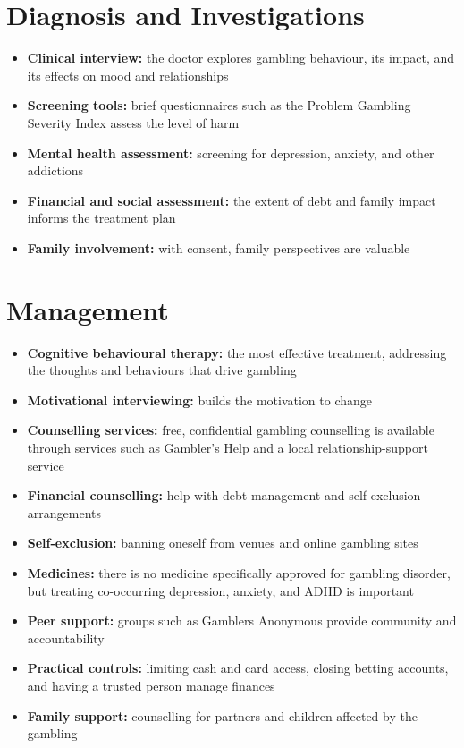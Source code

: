 \section*{Diagnosis and Investigations}
\begin{itemize}
    \item \textbf{Clinical interview:} the doctor explores gambling behaviour, its impact, and its effects on mood and relationships
    \item \textbf{Screening tools:} brief questionnaires such as the Problem Gambling Severity Index assess the level of harm
    \item \textbf{Mental health assessment:} screening for depression, anxiety, and other addictions
    \item \textbf{Financial and social assessment:} the extent of debt and family impact informs the treatment plan
    \item \textbf{Family involvement:} with consent, family perspectives are valuable
\end{itemize}

\section*{Management}
\begin{itemize}
    \item \textbf{Cognitive behavioural therapy:} the most effective treatment, addressing the thoughts and behaviours that drive gambling
    \item \textbf{Motivational interviewing:} builds the motivation to change
    \item \textbf{Counselling services:} free, confidential gambling counselling is available through services such as Gambler's Help and a local relationship-support service
    \item \textbf{Financial counselling:} help with debt management and self-exclusion arrangements
    \item \textbf{Self-exclusion:} banning oneself from venues and online gambling sites
    \item \textbf{Medicines:} there is no medicine specifically approved for gambling disorder, but treating co-occurring depression, anxiety, and ADHD is important
    \item \textbf{Peer support:} groups such as Gamblers Anonymous provide community and accountability
    \item \textbf{Practical controls:} limiting cash and card access, closing betting accounts, and having a trusted person manage finances
    \item \textbf{Family support:} counselling for partners and children affected by the gambling
\end{itemize}

